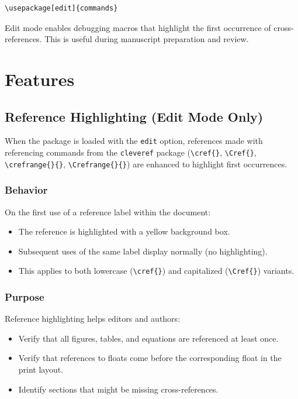\documentclass[11pt]{article}
\begin{document}
\begin{verbatim}
\usepackage[edit]{commands}
\end{verbatim}

Edit mode enables debugging macros that highlight the first occurrence of cross-references. 
This is useful during manuscript preparation and review.

\section{Features}

\subsection{Reference Highlighting (Edit Mode Only)}

When the package is loaded with the \verb|edit| option, 
references made with referencing commands from the \verb|cleveref| package 
(\verb|\cref{}|, \verb|\Cref{}|, \verb|\crefrange{}{}|, 
\verb|\Crefrange{}{}|) are enhanced to highlight first occurrences.

\subsubsection{Behavior}

On the first use of a reference label within the document:
\begin{itemize}
  \item The reference is highlighted with a yellow background box.
  \item Subsequent uses of the same label display normally (no highlighting).
  \item This applies to both lowercase (\verb|\cref{}|) and capitalized (\verb|\Cref{}|) variants.
\end{itemize}

\subsubsection{Purpose}

Reference highlighting helps editors and authors:
\begin{itemize}
  \item Verify that all figures, tables, and equations are referenced at least once.
  \item Verify that references to floats come before the corresponding float in the print layout.
  \item Identify sections that might be missing cross-references.
\end{itemize}
\end{document}

